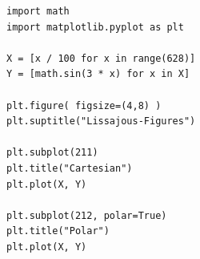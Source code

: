\begin{frame}[fragile]
%
\begin{center}
%
\begin{codebox}[\raggedright Example: Lissajous I, width=.6\linewidth, nobeforeafter, equal height group = grpXmpLissajous]
\begin{verbatim}
import math
import matplotlib.pyplot as plt

X = [x / 100 for x in range(628)]
Y = [math.sin(3 * x) for x in X]

plt.figure( figsize=(4,8) )
plt.suptitle("Lissajous-Figures")

plt.subplot(211)
plt.title("Cartesian")
plt.plot(X, Y)

plt.subplot(212, polar=True)
plt.title("Polar")
plt.plot(X, Y)


\end{verbatim}
\end{codebox}
\end{center}
\end{frame}
